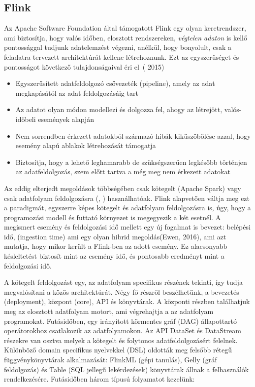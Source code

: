 \documentclass[a4paper,12pt]{article}
\begin{document}
\subsection{Flink}
Az Apache Software Foundation által támogatott Flink egy olyan keretrendszer, ami biztosítja, hogy valós időben, elosztott rendszereken, \textsl{végtelen adaton} is kellő pontossággal tudjunk adatelemzést végezni, anélkül, hogy bonyolult, csak a feladatra tervezett architektúrát kellene létrehoznunk. Ezt az egyszerűséget és pontosságot következő tulajdonságaival éri el~(\citeauthor{flinkartisans} 2015)
\begin{itemize}
\item Egyszerűsített adatfeldolgozó csővezeték (pipeline), amely az adat megkapásától az adat feldolgozásáig tart
\item Az adatot olyan módon modellezi és dolgozza fel, ahogy az létrejött, valós-időbeli események alapján
\item Nem sorrendben érkezett adatokból származó hibák kiküszöbölése azzal, hogy esemény alapú ablakok létrehozását támogatja
\item Biztosítja, hogy a lehető leghamarabb de szükségszerűen legkésőbb történjen az adatfeldolgozás, szem előtt tartva a még meg nem érkezett adatokat
\end{itemize}

Az eddig elterjedt megoldások többségében csak kötegelt (Apache Spark) vagy csak adatfolyam feldolgozásra (\cite{storm}, \cite{infosphere}) használhatóak. Flink alapvetően váltja meg ezt a paradigmát, egyszerre képes kötegelt és adatfolyam feldolgozásra is, úgy, hogy a programozási modell és futtató környezet is megegyezik a két esetnél. A megismert esemény és feldolgozási idő mellett egy új fogalmat is bevezet: belépési idő, (ingestion time) ami egy olyan hibrid megoldás(Ewen, 2016), ami azt mutatja, hogy mikor került a Flink-ben az adott esemény.
Ez alacsonyabb késleltetést biztosít mint az esemény idő, és pontosabb eredményt mint a feldolgozási idő. \newline

A kötegelt feldolgozást egy, az adatfolyam specifikus részének tekinti, így tudja megvalósítani a közös architektúrát. Négy fő részről beszélhetünk, a bevezetés (deployment), központ (core), API és könyvtárak. A központi részben találhatjuk meg az elosztott adatfolyam motort, ami végrehajtja a az adatfolyam programokat. Futásidőben, egy irányított körmentes gráf (DAG) állapottartó operátorokhoz csatlakozik az adatfolyamokon. Az API DataSet és DataStream részekre van osztva melyek a kötegelt és folytonos adatfeldolgozásért felelnek. Különböző domain specifikus nyelvekkel (DSL) oldották meg felsőbb rétegű függvénykönyvtárak alkalmazását: FlinkML (gépi tanulás), Gelly (gráf feldolgozás) és Table (SQL jellegű lekérdezések) könyvtárak állnak a felhasználók rendelkezésére.  Futásidőben három típusú folyamatot kezelünk:
 
\end{document}
